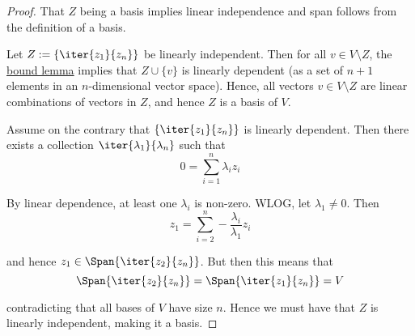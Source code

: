 \begin{proof}
  That $Z$ being a basis implies linear independence and span follows from the
  definition of a basis.


  Let $Z:=\{\iter{z_1}{z_n}\}$ be linearly independent. Then for all $v\in
  V\setminus Z$, the \href{e054922}{bound lemma} implies that $Z\cup\{v\}$ is
  linearly dependent (as a set of $n+1$ elements in an $n$-dimensional vector
  space). Hence, all vectors $v\in V\setminus Z$ are linear combinations of
  vectors in $Z$, and hence $Z$ is a basis of $V$.


  Assume on the contrary that $\{\iter{z_1}{z_n}\}$ is linearly dependent. Then
  there exists a collection $\iter{\lambda_1}{\lambda_n}$ such that
  $$
    0=\sum_{i=1}^n\lambda_iz_i
  $$

  By linear dependence, at least one $\lambda_i$ is non-zero. WLOG, let
  $\lambda_1\neq0$. Then
  $$
    z_1=\sum_{i=2}^n-\frac{\lambda_i}{\lambda_1}z_i
  $$

  and hence $z_1\in\Span\{\iter{z_2}{z_n}\}$. But then this means that
  $$
    \Span\{\iter{z_2}{z_n}\}=\Span\{\iter{z_1}{z_n}\}=V
  $$

  contradicting that all bases of $V$ have size $n$. Hence we must have that
  $Z$ is linearly independent, making it a basis.
\end{proof}
